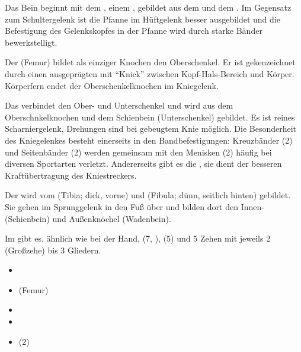 \clearpage
{}
{%
\label{topic:untere-extremitaet}%
%
Das Bein beginnt mit dem , einem
, gebildet aus dem  und dem
. Im Gegensatz zum Schultergelenk ist
die Pfanne im Hüftgelenk besser ausgebildet und die
Befestigung des Gelenkskopfes in der Pfanne wird durch
starke Bänder bewerkstelligt.

Der  (Femur) bildet als einziger
Knochen den Oberschenkel. Er ist gekenzeichnet durch einen
ausgeprägten  mit \protect\enquote{Knick}
zwischen Kopf-Hals-Bereich und Körper. Körperfern endet der
Oberschenkelknochen im Kniegelenk.

Das  verbindet den Ober- und Unterschenkel und
wird aus dem Oberschnkelknochen und dem Schienbein
(Unterschenkel) gebildet. Es ist  reines
Scharniergelenk, Drehungen sind bei gebeugtem Knie möglich.
Die Besonderheit des Kniegelenkes besteht einerseits in den
Bandbefestigungen: Kreuzbänder (2) und Seitenbänder (2)
werden gemeinsam mit den Menisken (2) häufig bei diversen
Sportarten verletzt. Andererseits gibt es die
, sie dient der besseren Kraftübertragung
des Kniestreckers.
\cite{PetersenVordereKreuzband1,MuellerKnie1,SchabusKnie1}

Der  wird vom  (Tibia; dick,
vorne) und  (Fibula; dünn, seitlich hinten)
gebildet. Sie gehen im Sprunggelenk in den Fuß über und
bilden dort den Innen- (Schienbein) und Außenknöchel
(Wadenbein).

Im  gibt es, ähnlich wie bei der Hand,
 (7, ),  (5) und 5 Zehen mit
jeweils 2 (Großzehe) bis 3 Gliedern.
}{
\begin{itemize}
    \item {}  
    \item {}   
    (Femur)
    \item {}  
    \item {}  
    \item {} (2)


\end{itemize}}

